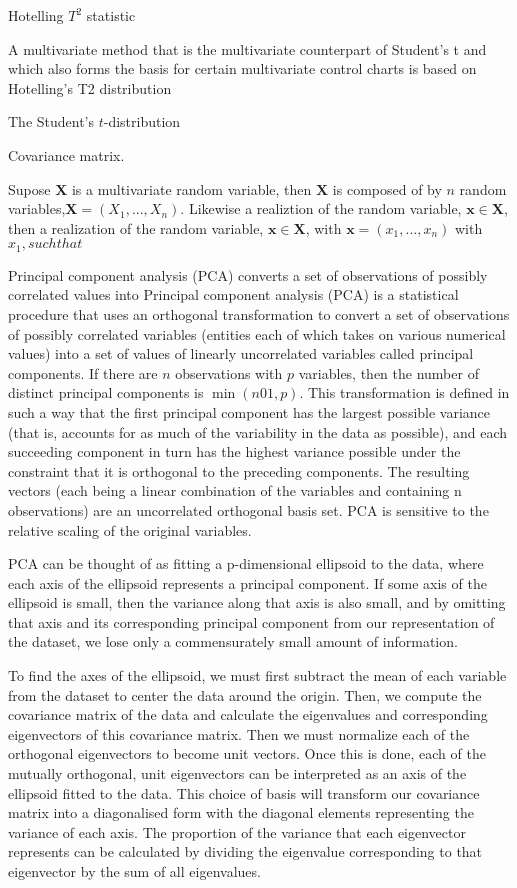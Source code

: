 Hotelling $T^2$ statistic

A multivariate method that is the multivariate counterpart of Student's t and which also forms the basis for certain multivariate control charts is based on Hotelling's T2 distribution\cite{hotelling1947_t2}

The Student's $t$-distribution

Covariance matrix.

Supose $\bm{X}$ is a multivariate random variable, then $\bm{X}$ is composed of by $n$ random variables,$\bm{X} = (X_1,...,X_n)$.  Likewise a realiztion of the random variable, $\bm{x} \in \bm{X}$, then a realization of the random variable, $\bm{x} \in \bm{X}$, with $\bm{x}=(x_1,...,x_n)$ with $x_1, such that $\in{}$

$

Principal component analysis (PCA)\cite{pearson1901_pca,hotelling1936_pca} converts a set of observations of possibly correlated values into
Principal component analysis (PCA) is a statistical procedure that uses an orthogonal transformation to convert a set of observations of possibly correlated variables (entities each of which takes on various numerical values) into a set of values of linearly uncorrelated variables called principal components. If there are $n$ observations with $p$ variables, then the number of distinct principal components is $\min(n01,p)$. This transformation is defined in such a way that the first principal component has the largest possible variance (that is, accounts for as much of the variability in the data as possible), and each succeeding component in turn has the highest variance possible under the constraint that it is orthogonal to the preceding components. The resulting vectors (each being a linear combination of the variables and containing n observations) are an uncorrelated orthogonal basis set. PCA is sensitive to the relative scaling of the original variables. 

PCA can be thought of as fitting a p-dimensional ellipsoid to the data, where each axis of the ellipsoid represents a principal component. If some axis of the ellipsoid is small, then the variance along that axis is also small, and by omitting that axis and its corresponding principal component from our representation of the dataset, we lose only a commensurately small amount of information.

To find the axes of the ellipsoid, we must first subtract the mean of each variable from the dataset to center the data around the origin. Then, we compute the covariance matrix of the data and calculate the eigenvalues and corresponding eigenvectors of this covariance matrix. Then we must normalize each of the orthogonal eigenvectors to become unit vectors. Once this is done, each of the mutually orthogonal, unit eigenvectors can be interpreted as an axis of the ellipsoid fitted to the data. This choice of basis will transform our covariance matrix into a diagonalised form with the diagonal elements representing the variance of each axis. The proportion of the variance that each eigenvector represents can be calculated by dividing the eigenvalue corresponding to that eigenvector by the sum of all eigenvalues.


